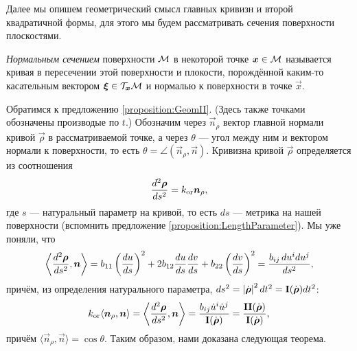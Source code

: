 Далее мы опишем геометрический смысл главных кривизн и второй квадратичной формы, для этого мы будем рассматривать сечения поверхности плоскостями. 

\begin{definition}
	\textit{Нормальным сечением} поверхности $\mathcal{M}$ в некоторой точке $\boldsymbol{x} \in \mathcal{M}$ называется кривая в пересечении этой поверхности и плокости, порождённой каким-то касательным вектором $\boldsymbol{\xi} \in \mathcal{T}_{\boldsymbol{x}}\mathcal{M}$ и нормалью к поверхности в точке $\vec{x}$.
\end{definition}

%

Обратимся к предложению \ref{proposition:GeomII}. (Здесь также точками обозначены производые по $t$.) Обозначим через $\vec{n}_\rho$ вектор главной нормали кривой $\vec{\rho}$ в рассматриваемой точке, а через $\theta$ --- угол между ним и вектором нормали к поверхности, то есть $\theta = \angle(\vec{n}_\rho, \vec{n})$. Кривизна\footnotemark{} кривой $\vec{\rho}$ определяется из соотношения
\[
	\frac{d^2\boldsymbol{\rho}}{ds^2} = k_{\mathrm{or}}\boldsymbol{n}_\rho,
\]
где $s$ --- натуральный параметр на кривой, то есть $ds$ --- метрика на нашей поверхности (вспомнить предложение \ref{proposition:LengthParameter}). Мы уже поняли, что
\[
	\left\langle\frac{d^2\boldsymbol{\rho}}{ds^2}, \boldsymbol{n}\right\rangle = b_{11}\left(\frac{du}{ds}\right)^2 + 2b_{12}\frac{du}{ds}\frac{dv}{ds} + b_{22}\left(\frac{dv}{ds}\right)^2 = \frac{b_{ij}\,du^idu^j}{ds^2},
\]
причём, из определения натурального параметра, $ds^2 = \left\lvert\dot{\boldsymbol{\rho}}\right\rvert^2dt^2 = \boldsymbol{\operatorname{I}}(\dot{\boldsymbol{\rho}})dt^2$:
\[
	k_{\mathrm{or}}\langle\boldsymbol{n}_\rho, \boldsymbol{n}\rangle = \left\langle\frac{d^2\boldsymbol{\rho}}{ds^2}, \boldsymbol{n}\right\rangle = \frac{b_{ij}\dot{u}^i\dot{u}^j}{\boldsymbol{\operatorname{I}}(\dot{\boldsymbol{\rho}})} = \frac{\boldsymbol{\operatorname{II}}(\dot{\boldsymbol{\rho}})}{\boldsymbol{\operatorname{I}}(\dot{\boldsymbol{\rho}})},
\]
причём $\langle\vec{n}_\rho, \vec{n}\rangle = \cos\theta$. Таким образом, нами доказана следующая теорема.

